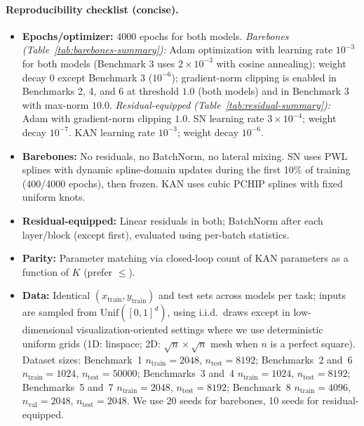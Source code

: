 \documentclass{article}
\theoremstyle{plain}
\theoremstyle{definition}
\theoremstyle{remark}
\begin{document}
\paragraph{Reproducibility checklist (concise).}
\begin{itemize}[leftmargin=*,nosep]
\item \textbf{Epochs/optimizer:} $4000$ epochs for both models. \emph{Barebones (Table~\ref{tab:barebones-summary}):} Adam optimization with learning rate $10^{-3}$ for both models (Benchmark 3 uses $2\times 10^{-3}$ with cosine annealing); weight decay $0$ except Benchmark 3 ($10^{-6}$); gradient-norm clipping is enabled in Benchmarks 2, 4, and 6 at threshold $1.0$ (both models) and in Benchmark 3 with max-norm $10.0$. \emph{Residual-equipped (Table~\ref{tab:residual-summary}):} Adam with gradient-norm clipping $1.0$. SN learning rate $3\times 10^{-4}$; weight decay $10^{-7}$. KAN learning rate $10^{-3}$; weight decay $10^{-6}$.
\item \textbf{Barebones:} No residuals, no BatchNorm, no lateral mixing. SN uses PWL splines with dynamic spline-domain updates during the first 10\% of training (400/4000 epochs), then frozen. KAN uses cubic PCHIP splines with fixed uniform knots.
\item \textbf{Residual-equipped:} Linear residuals in both; BatchNorm after each layer/block (except first), evaluated using per-batch statistics.
\item \textbf{Parity:} Parameter matching via closed-loop count of KAN parameters as a function of $K$ (prefer $\leq$).
\item \textbf{Data:} Identical $(x_{\text{train}},y_{\text{train}})$ and test sets across models per task; inputs are sampled from $\mathrm{Unif}([0,1]^d)$, using i.i.d.\ draws except in low-dimensional visualization-oriented settings where we use deterministic uniform grids (1D: linspace; 2D: $\sqrt{n}\times\sqrt{n}$ mesh when $n$ is a perfect square). Dataset sizes: Benchmark~1 $n_{\text{train}}=2048$, $n_{\text{test}}=8192$; Benchmarks~2 and~6 $n_{\text{train}}=1024$, $n_{\text{test}}=50000$; Benchmarks~3 and~4 $n_{\text{train}}=1024$, $n_{\text{test}}=8192$; Benchmarks~5 and~7 $n_{\text{train}}=2048$, $n_{\text{test}}=8192$; Benchmark~8 $n_{\text{train}}=4096$, $n_{\text{val}}=2048$, $n_{\text{test}}=2048$. We use 20 seeds for barebones, 10 seeds for residual-equipped.
\end{itemize}
\end{document}
